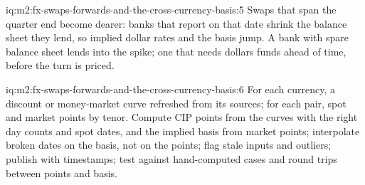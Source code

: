 \begin{solution}{iq:m2:fx-swaps-forwards-and-the-cross-currency-basis:5}
Swaps that span the quarter end become dearer: banks that report on that date
shrink the balance sheet they lend, so implied dollar rates and the basis jump.
A bank with spare balance sheet lends into the spike; one that needs dollars
funds ahead of time, before the turn is priced.
\end{solution}

\begin{solution}{iq:m2:fx-swaps-forwards-and-the-cross-currency-basis:6}
For each currency, a discount or money-market curve refreshed from its sources;
for each pair, spot and market points by tenor. Compute CIP points from the curves
with the right day counts and spot dates, and the implied basis from market
points; interpolate broken dates on the basis, not on the points; flag stale
inputs and outliers; publish with timestamps; test against hand-computed cases and
round trips between points and basis.
\end{solution}
